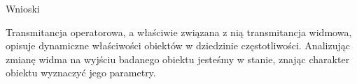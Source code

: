\documentclass[12pt]{article}
\begin{document}
  \begin{section}{Wnioski}
  
    Transmitancja operatorowa, a właściwie związana z nią transmitancja widmowa,
    opisuje dynamiczne właściwości obiektów w dziedzinie częstotliwości.
    Analizując zmianę widma na wyjściu badanego obiektu jesteśmy w stanie,
    znając charakter obiektu wyznaczyć jego parametry.
    
  \end{section}
\end{document}
